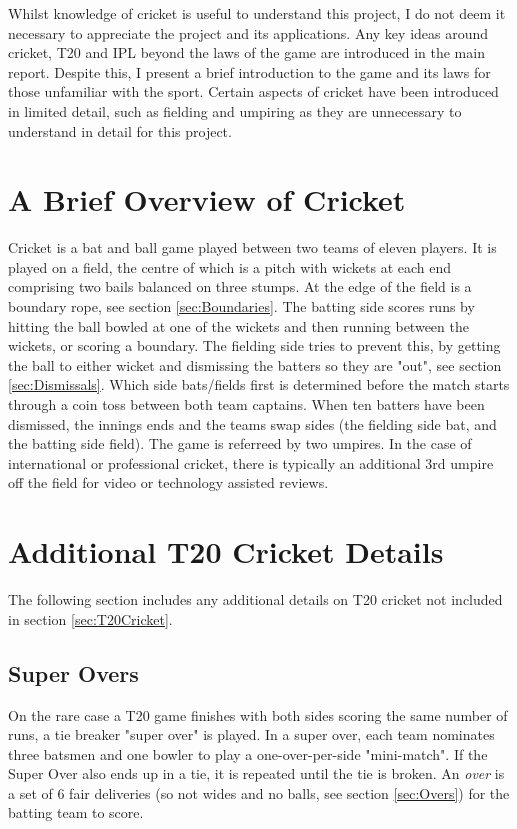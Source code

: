 \documentclass[12pt,a4paper]{report}
\theoremstyle{definition}
\begin{document}
Whilst knowledge of cricket is useful to understand this project, I do not deem it necessary to appreciate the project and its applications.
Any key ideas around cricket, T20 and IPL beyond the laws of the game are introduced in the main report.
Despite this, I present a brief introduction to the game and its laws for those unfamiliar with the sport.
Certain aspects of cricket have been introduced in limited detail, such as fielding and umpiring as they are unnecessary to understand in detail for this project.

\section{A Brief Overview of Cricket}

Cricket is a bat and ball game played between two teams of eleven players. 
It is played on a field, the centre of which is a pitch with wickets at each end comprising two bails balanced on three stumps. 
At the edge of the field is a boundary rope, see section \ref{sec:Boundaries}. 
The batting side scores runs by hitting the ball bowled at one of the wickets and then running between the wickets, or scoring a boundary.
The fielding side tries to prevent this, by getting the ball to either wicket and dismissing the batters so they are "out", see section \ref{sec:Dismissals}.
Which side bats/fields first is determined before the match starts through a coin toss between both team captains.
When ten batters have been dismissed, the innings ends and the teams swap sides (the fielding side bat, and the batting side field).
The game is referreed by two umpires.
In the case of international or professional cricket, there is typically an additional 3rd umpire off the field for video or technology assisted reviews.

\section{Additional T20 Cricket Details} \label{sec:AdditionalT20Cricket}

The following section includes any additional details on T20 cricket not included in section \ref{sec:T20Cricket}.

\subsection{Super Overs}

On the rare case a T20 game finishes with both sides scoring the same number of runs, a tie breaker "super over" is played.
In a super over, each team nominates three batsmen and one bowler to play a one-over-per-side "mini-match".
If the Super Over also ends up in a tie, it is repeated until the tie is broken.
An \emph{over} is a set of 6 fair deliveries (so not wides and no balls, see section \ref{sec:Overs}) for the batting team to score.
\end{document}
